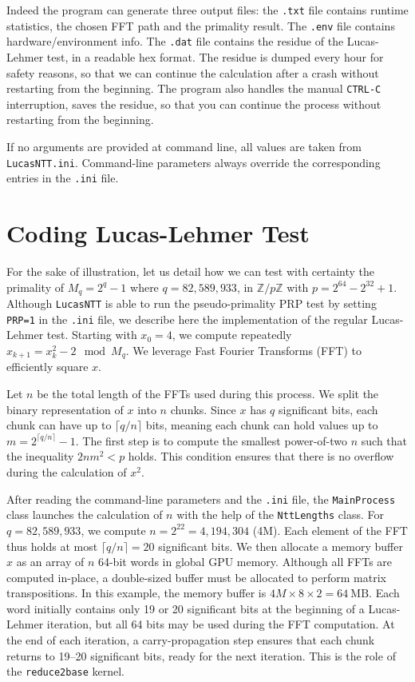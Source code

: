 \documentclass{article}
\begin{document}
Indeed the program can generate three output files: the \texttt{.txt} file contains runtime statistics, the chosen FFT path and the primality result. The \texttt{.env} file contains hardware/environment info. The \texttt{.dat} file contains the residue of the Lucas-Lehmer test, in a readable hex format. The residue is dumped every hour for safety reasons, so that we can continue the calculation after a crash without restarting from the beginning. The program also handles the manual \texttt{CTRL-C} interruption, saves the residue, so that you can continue the process without restarting from the beginning.

If no arguments are provided at command line, all values are taken from \texttt{LucasNTT.ini}. Command-line parameters always override the corresponding entries in the \texttt{.ini} file.

\section{Coding Lucas-Lehmer Test}

For the sake of illustration, let us detail how we can test with certainty the primality of $M_q = 2^q - 1$ where $q = 82,\!589,\!933$, in $\mathbb{Z}/p\mathbb{Z}$ with $p = 2^{64} - 2^{32} + 1$. Although \texttt{LucasNTT} is able to run the pseudo-primality PRP test by setting \texttt{PRP=1} in the \texttt{.ini} file, we describe here the implementation of the regular Lucas-Lehmer test. Starting with $x_0 = 4$, we compute repeatedly $x_{k+1} = x_k^2 - 2 \mod M_q$. We leverage Fast Fourier Transforms (FFT) to efficiently square $x$.

Let $n$ be the total length of the FFTs used during this process. We split the binary representation of $x$ into $n$ chunks. Since $x$ has $q$ significant bits, each chunk can have up to $\lceil q / n \rceil$ bits, meaning each chunk can hold values up to
$m = 2^{\lceil q / n \rceil} - 1$.
The first step is to compute the smallest power-of-two $n$ such that the inequality
$2nm^2 < p$ holds. This condition ensures that there is no overflow during the calculation of $x^2$.

After reading the command-line parameters and the \texttt{.ini} file, the \texttt{MainProcess} class launches the calculation of $n$ with the help of the \texttt{NttLengths} class. For $q = 82,\!589,\!933$, we compute $n = 2^{22} = 4,\!194,\!304$ (4M). Each element of the FFT thus holds at most $\lceil q / n \rceil = 20$ significant bits. We then allocate a memory buffer $x$ as an array of $n$ 64-bit words in global GPU memory. Although all FFTs are computed in-place, a double-sized buffer must be allocated to perform matrix transpositions. In this example, the memory buffer is
$4M \times 8 \times 2 = 64\ \text{MB}$.
Each word initially contains only 19 or 20 significant bits at the beginning of a Lucas-Lehmer iteration, but all 64 bits may be used during the FFT computation. At the end of each iteration, a carry-propagation step ensures that each chunk returns to 19--20 significant bits, ready for the next iteration. This is the role of the \texttt{reduce2base} kernel.
\end{document}
